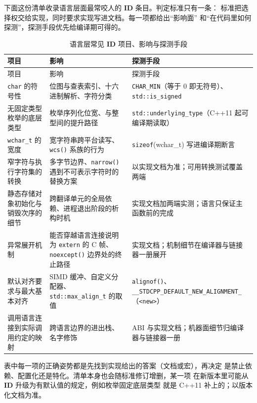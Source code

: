 \documentclass[12pt,a4paper,fontset=fandol]{ctexbook}
\newcommand{\cpp}[1]{C++#1}
\newcommand{\Fn}[1]{\texttt{#1()}}
\newcommand{\Tp}[1]{\texttt{#1}}
\newcommand{\Bk}{\discretionary{}{}{}}
\newcommand{\IDB}{\textbf{\textsf{ID}}}
\newcommand{\Hdr}[1]{\texttt{<#1>}}
\newcommand{\Feat}[1]{\texttt{#1}}
\begin{document}
下面这份清单收录语言层面最常咬人的 \IDB{} 条目。判定标准只有一条：
标准把选择权交给实现，同时要求实现写进文档。每一项都给出“影响面”
和“在代码里如何探测”，探测手段优先给编译期可得的。

\begin{longtable}{@{}>{\raggedright\arraybackslash}p{} >{\raggedright\arraybackslash}p{} >{\raggedright\arraybackslash}p{}@{}}
\caption{语言层常见 \IDB{} 项目、影响与探测手段}\label{tab:ub13-idb-list}\\
\toprule
项目 & 影响 & 探测手段 \\
\midrule
\endfirsthead
\toprule
项目 & 影响 & 探测手段 \\
\midrule
\endhead
\bottomrule
\endfoot
\Tp{char} 的符号性 &
位图与查表索引、十六进制解析、字符分类 &
\Feat{CHAR\_MIN}（等于 0 即无符号）、\Tp{std::is\_signed} \\
\addlinespace
无固定类型枚举的底层类型 &
枚举序列化位宽、与整型间的提升路径 &
\Tp{std::underlying{\Bk}\_type}（\cpp{11} 起可编译期读取） \\
\addlinespace
\Tp{wchar\_t} 的宽度 &
宽字符串跨平台读写、\Fn{wcs} 系族的行为 &
\Tp{sizeof}(wchar\_t) 写进编译期断言 \\
\addlinespace
窄字符与执行字符集的转换 &
多字节边界、\Fn{narrow} 遇到不可表示字符时的替换方案 &
以实现文档为准；可用转换测试覆盖两端 \\
\addlinespace
静态存储对象初始化与销毁次序的细节 &
跨翻译单元的全局依赖、进程退出阶段的析构时机 &
实现文档加两端实测；语言只保证主函数前的完成 \\
\addlinespace
异常展开机制 &
能否穿越语言连接说明为 \Tp{extern} 的 C 帧、\Fn{noexcept}
边界处的终止路径 &
实现文档；机制细节在编译器与链接器一册展开 \\
\addlinespace
默认对齐要求与最大基本对齐 &
SIMD 缓冲、自定义分配器、\Tp{std::max{\Bk}\_align{\Bk}\_t} 的取值 &
\Fn{alignof}、\Feat{\_\_STDCPP{\Bk}\_DEFAULT{\Bk}\_NEW{\Bk}\_ALIGNMENT{\Bk}\_}（\Hdr{new}） \\
\addlinespace
调用语言连接到实际调用约定的映射 &
跨语言边界的进出栈、名字修饰 &
ABI 与实现文档；机器面细节归编译器与链接器一册 \\
\end{longtable}

\begin{note}[title=清单的用法是查“谁来回答”，不是照抄结论]
表中每一项的正确姿势都是先找到实现给出的答案（文档或宏），再决定
是禁止依赖、配置化还是特化。清单本身也会随标准修订增删，某一项
在新版本里可能从 \IDB{} 升级为有默认值的规定，例如枚举固定底层类型
就是 \cpp{11} 补上的；以版本化文档为准。
\end{note}
\end{document}
